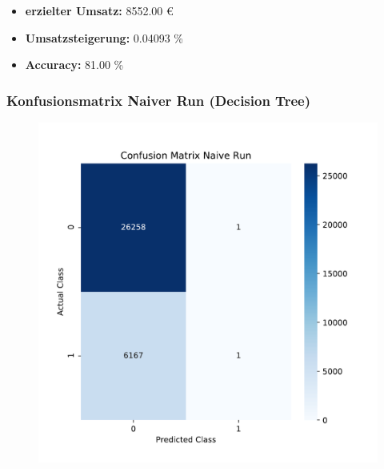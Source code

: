 \documentclass{beamer}
\begin{document}
\begin{frame}
\begin{footnotesize}
\begin{itemize}
\item  \textbf{erzielter Umsatz:} 8552.00 \euro{}
\item \textbf{Umsatzsteigerung:}	0.04093 \% 
\item \textbf{Accuracy:} 81.00 \%
\end{itemize}
\end{footnotesize}

\frametitle{Konfusionsmatrix Naiver Run (Decision Tree)}
\begin{figure}
\begin{center}
\includegraphics[width=.5\textwidth]{pdf/confusion1.pdf}
\end{center}
\end{figure}
\end{frame}
\end{document}
